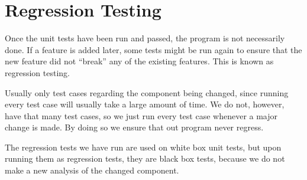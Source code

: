 \section{Regression Testing}
Once the unit tests have been run and passed, the program is not necessarily done.
If a feature is added later, some tests might be run again to ensure that the new feature did not ``break'' any of the existing features.
This is known as regression testing.

Usually only test cases regarding the component being changed, since running every test case will usually take a large amount of time.
We do not, however, have that many test cases, so we just run every test case whenever a major change is made.
By doing so we ensure that out program never regress.

The regression tests we have run are used on white box unit tests, but upon running them as regression tests, they are black box tests, because we do not make a new analysis of the changed component.